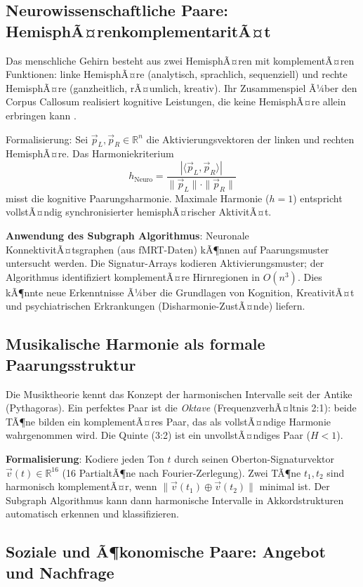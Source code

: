 ﻿\documentclass[a4paper,12pt]{article}
\theoremstyle{definition}
\begin{document}
\subsection{Neurowissenschaftliche Paare: HemisphÃ¤renkomplementaritÃ¤t}

Das menschliche Gehirn besteht aus zwei HemisphÃ¤ren mit komplementÃ¤ren
Funktionen: linke HemisphÃ¤re (analytisch, sprachlich, sequenziell) und
rechte HemisphÃ¤re (ganzheitlich, rÃ¤umlich, kreativ). Ihr Zusammenspiel Ã¼ber
den Corpus Callosum realisiert kognitive Leistungen, die keine HemisphÃ¤re
allein erbringen kann \cite{weyl1952}.

Formalisierung: Sei $\vec{p}_L, \vec{p}_R \in \mathbb{R}^n$ die Aktivierungsvektoren
der linken und rechten HemisphÃ¤re. Das Harmoniekriterium
\[
	h_{\mathrm{Neuro}} = \frac{|\langle \vec{p}_L, \vec{p}_R \rangle|}
	{\|\vec{p}_L\| \cdot \|\vec{p}_R\|}
\]
misst die kognitive Paarungsharmonie. Maximale Harmonie ($h = 1$) entspricht
vollstÃ¤ndig synchronisierter hemisphÃ¤rischer AktivitÃ¤t.

\textbf{Anwendung des Subgraph Algorithmus}: Neuronale KonnektivitÃ¤tsgraphen
(aus fMRT-Daten) kÃ¶nnen auf Paarungsmuster untersucht werden. Die Signatur-Arrays
kodieren Aktivierungsmuster; der Algorithmus identifiziert komplementÃ¤re
Hirnregionen in $O(n^3)$. Dies kÃ¶nnte neue Erkenntnisse Ã¼ber die Grundlagen
von Kognition, KreativitÃ¤t und psychiatrischen Erkrankungen (Disharmonie-ZustÃ¤nde)
liefern.

\subsection{Musikalische Harmonie als formale Paarungsstruktur}

Die Musiktheorie kennt das Konzept der harmonischen Intervalle seit der Antike
(Pythagoras). Ein perfektes Paar ist die \emph{Oktave} (FrequenzverhÃ¤ltnis 2:1):
beide TÃ¶ne bilden ein komplementÃ¤res Paar, das als vollstÃ¤ndige Harmonie
wahrgenommen wird. Die Quinte (3:2) ist ein unvollstÃ¤ndiges Paar ($H < 1$).

\textbf{Formalisierung}: Kodiere jeden Ton $t$ durch seinen Oberton-Signaturvektor
$\vec{v}(t) \in \mathbb{R}^{16}$ (16 PartialtÃ¶ne nach Fourier-Zerlegung).
Zwei TÃ¶ne $t_1, t_2$ sind harmonisch komplementÃ¤r, wenn
$\|\vec{v}(t_1) \oplus \vec{v}(t_2)\|$ minimal ist.
Der Subgraph Algorithmus kann dann harmonische Intervalle in Akkordstrukturen
automatisch erkennen und klassifizieren.

\subsection{Soziale und Ã¶konomische Paare: Angebot und Nachfrage}
\end{document}
